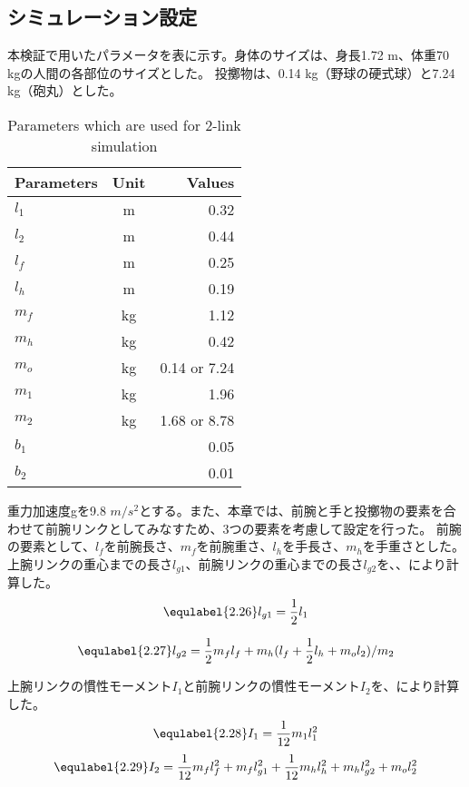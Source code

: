 \subsection{シミュレーション設定}
本検証で用いたパラメータを表に示す。身体のサイズは、身長1.72 m、体重70 kgの人間の各部位のサイズとした。
投擲物は、0.14 kg（野球の硬式球）と7.24 kg（砲丸）とした。
\begin{table}[tb]
  \begin{center}
    \caption{Parameters which are used for 2-link simulation}
    \begin{tabular}{l|c|r}
      \hline
      Parameters & Unit & Values \\
      \hline
      $l_{1}$ & m & 0.32 \\
      $l_{2}$ & m & 0.44 \\
      $l_{f}$ & m & 0.25 \\
      $l_{h}$ & m & 0.19 \\
      $m_{f}$ & kg & 1.12 \\
      $m_{h}$ & kg & 0.42 \\
      $m_{o}$ & kg & 0.14 or 7.24 \\
      $m_{1}$ & kg & 1.96 \\
      $m_{2}$ & kg & 1.68 or 8.78 \\
      $b_{1}$ &  & 0.05 \\
      $b_{2}$ &  & 0.01 \\
      \hline
    \end{tabular}
  \end{center}
\end{table}
重力加速度gを9.8 $m/s^{2}$とする。また、本章では、前腕と手と投擲物の要素を合わせて前腕リンクとしてみなすため、3つの要素を考慮して設定を行った。
前腕の要素として、$l_{f}$を前腕長さ、$m_{f}$を前腕重さ、$l_{h}$を手長さ、$m_{h}$を手重さとした。\\
上腕リンクの重心までの長さ$l_{g1}$、前腕リンクの重心までの長さ$l_{g2}$を、、により計算した。
\begin{eqnarray}
  \equlabel{2.26}
  l_{g1}=\frac{1}{2}l_{1}
\end{eqnarray}

\begin{eqnarray}
  \equlabel{2.27}
  l_{g2}=\frac{1}{2}m_{f}l_{f}+m_{h}(l_{f}+\frac{1}{2}l_{h}+m_{o}l_{2})/m_{2}
\end{eqnarray}

上腕リンクの慣性モーメント$I_{1}$と前腕リンクの慣性モーメント$I_{2}$を、により計算した。
\begin{eqnarray}
  \equlabel{2.28}
  I_{1}=\frac{1}{12}m_{1}l_{1}^{2}
\end{eqnarray}
\begin{eqnarray}
  \equlabel{2.29}
  I_{2}=\frac{1}{12}m_{f}l_{f}^{2}+m_{f}l_{g1}^{2}+\frac{1}{12}m_{h}l_{h}^{2}+m_{h}l_{g2}^{2}+m_{o}l_{2}^{2}
\end{eqnarray}

